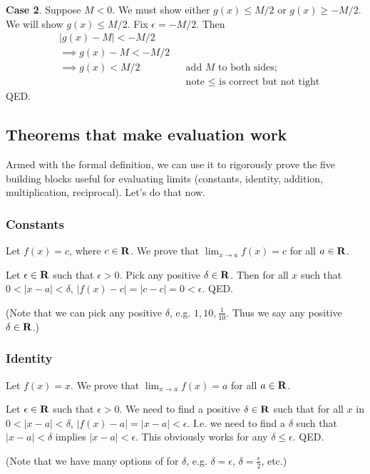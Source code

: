 \textbf{Case 2}. Suppose $M<0$. We must show either $g(x)\leq M/2$ or
$g(x)\geq -M/2$. We will show $g(x)\leq M/2$. Fix $\epsilon=-M/2$. Then
\begin{align*}
    &|g(x)-M|<-M/2\\
    &\implies g(x)-M<-M/2\\
    &\implies g(x)<M/2&&\text{add $M$ to both sides;}\\
    & &&\text{note $\leq$ is correct but not tight}
\end{align*}
QED.

\subsection{Theorems that make evaluation work}

Armed with the formal definition, we can use it to rigorously prove
the five building blocks useful for evaluating limits (constants,
identity, addition, multiplication, reciprocal). Let's do that now.

\subsubsection*{Constants}
Let $f(x)=c$, where $c\in\mathbf{R}$. We prove that $\lim_{x\to a}f(x)=c$ for all $a\in\mathbf{R}$.

\vs

Let $\epsilon\in\mathbf{R}$ such that $\epsilon>0$. Pick any positive
$\delta\in\mathbf{R}$. Then for all $x$ such that $0<|x-a|<\delta$,
$|f(x)-c|=|c-c|=0<\epsilon$. QED.

\vs

(Note that we can pick any positive $\delta$, e.g.
$1, 10, \frac{1}{10}$. Thus we say any positive $\delta\in\mathbf{R}$.)

\subsubsection*{Identity}

Let $f(x)=x$. We prove that $\lim_{x\to a}f(x)=a$ for all $a\in\mathbf{R}$.

\vs

Let $\epsilon\in\mathbf{R}$ such that $\epsilon>0$. We need to find a positive
$\delta\in\mathbf{R}$ such that for all $x$ in $0<|x-a|<\delta$,
$|f(x)-a|=|x-a|<\epsilon$. I.e. we need to find a $\delta$ such that
$|x-a|<\delta$ implies $|x-a|<\epsilon$. This obviously works for any $\delta\leq\epsilon$. QED.

\vs

(Note that we have many options of for $\delta$, e.g.
$\delta=\epsilon$, $\delta=\frac{\epsilon}{2}$, etc.)


